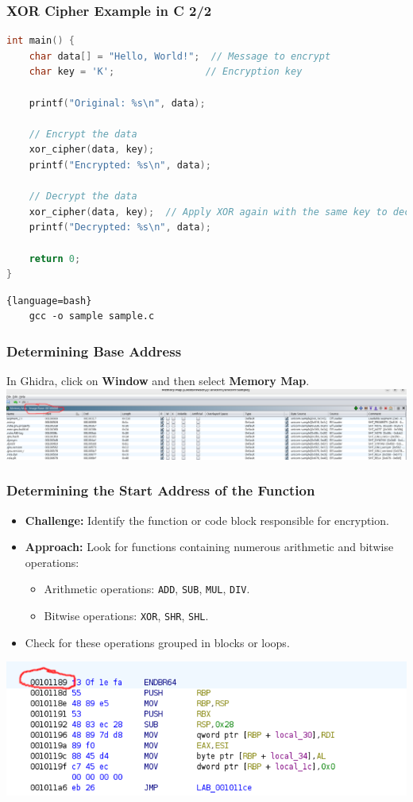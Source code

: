 \begin{frame}[fragile]
\frametitle{XOR Cipher Example in C 2/2}
\begin{lstlisting}[language=C]
int main() {
    char data[] = "Hello, World!";  // Message to encrypt
    char key = 'K';                // Encryption key

    printf("Original: %s\n", data);

    // Encrypt the data
    xor_cipher(data, key);
    printf("Encrypted: %s\n", data);

    // Decrypt the data
    xor_cipher(data, key);  // Apply XOR again with the same key to decrypt
    printf("Decrypted: %s\n", data);

    return 0;
}
\end{lstlisting}

\begin{lstlisting}{language=bash}
    gcc -o sample sample.c
\end{lstlisting}
\end{frame}

\begin{frame}
\frametitle{Determining Base Address}
In Ghidra, click on \textbf{Window} and then select \textbf{Memory Map}.
\vspace{1cm}
\centering
\includegraphics[scale=0.3]{img/base.png}
\end{frame}

\begin{frame}
    \frametitle{Determining the Start Address of the Function}
    \begin{itemize}
        \item \textbf{Challenge:} Identify the function or code block responsible for encryption.
        \item \textbf{Approach:} Look for functions containing numerous arithmetic and bitwise operations:
        \begin{itemize}
            \item Arithmetic operations: \texttt{ADD}, \texttt{SUB}, \texttt{MUL}, \texttt{DIV}.
            \item Bitwise operations: \texttt{XOR}, \texttt{SHR}, \texttt{SHL}.
        \end{itemize}
        \item Check for these operations grouped in blocks or loops.
    \end{itemize}
    \centering
    \includegraphics[scale=0.5]{img/start.png}
\end{frame}

